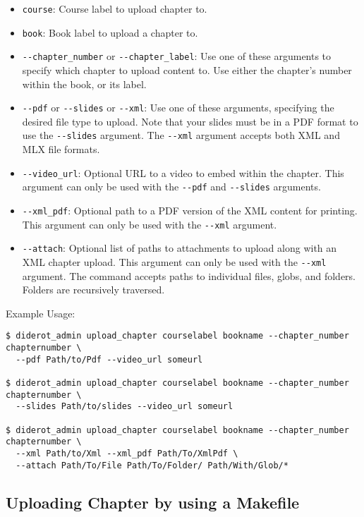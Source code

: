 \begin{itemize}
  \item \verb|course|: Course label to upload chapter to.
  \item \verb|book|: Book label to upload a chapter to.

  \item \verb|--chapter_number| or \verb|--chapter_label|: Use one of these arguments to specify which chapter to upload content to. Use either the chapter's number within the book, or its label.

  \item \verb|--pdf| or \verb|--slides| or \verb|--xml|: Use one of these arguments, specifying the desired file type to upload. Note that your slides must be in a PDF format to use the \verb|--slides| argument. The \verb|--xml| argument accepts both XML and MLX file formats.

  \item \verb|--video_url|: Optional URL to a video to embed within the chapter. This argument can only be used with the \verb|--pdf| and \verb|--slides| arguments.

  \item \verb|--xml_pdf|: Optional path to a PDF version of the XML content for printing. This argument can only be used with the \verb|--xml| argument.

  \item \verb|--attach|: Optional list of paths to attachments to upload along with an XML chapter upload. This argument can only be used with the \verb|--xml| argument. The command accepts paths to individual files, globs, and folders. Folders are recursively traversed.
\end{itemize}

Example Usage:
\begin{verbatim}
$ diderot_admin upload_chapter courselabel bookname --chapter_number chapternumber \
  --pdf Path/to/Pdf --video_url someurl

$ diderot_admin upload_chapter courselabel bookname --chapter_number chapternumber \
  --slides Path/to/slides --video_url someurl

$ diderot_admin upload_chapter courselabel bookname --chapter_number chapternumber \
  --xml Path/to/Xml --xml_pdf Path/To/XmlPdf \
  --attach Path/To/File Path/To/Folder/ Path/With/Glob/*
\end{verbatim}

\subsection{Uploading Chapter by using a Makefile}


